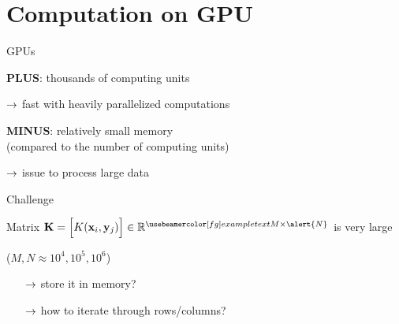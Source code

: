 \documentclass[14pt]{beamer}
\begin{document}
\section{Computation on GPU}


\begin{frame}{GPUs}

\textbf{PLUS}: thousands of computing units\medskip

$\rightarrow$ fast with heavily parallelized computations\bigskip\bigskip

\textbf{MINUS}: relatively small memory\\
{\small(compared to the number of computing units)}\medskip

$\rightarrow$ issue to process large data\bigskip

\end{frame}


\begin{frame}{Challenge}

\begin{center}
Matrix $\mb K = \Big[K(\mb x_i, \mb y_j)\Big] \in \RR^{\myexample{M}\times\alert{N}}$ is very large\medskip

($M, N \approx 10^4, 10^5, 10^6$)
\end{center}

\begin{itemize}
\setitsep{2em}
\item[$\rightarrow$] store it in memory? 
\item[$\rightarrow$] how to iterate through rows/columns?
\end{itemize}

\end{frame}
\end{document}
